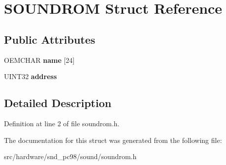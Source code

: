 \hypertarget{structSOUNDROM}{\section{S\-O\-U\-N\-D\-R\-O\-M Struct Reference}
\label{structSOUNDROM}
}
\subsection*{Public Attributes}
\begin{DoxyCompactItemize}
\item 
\hypertarget{structSOUNDROM_ac83eff0bb28762a6cf0d5c9774bd300c}{O\-E\-M\-C\-H\-A\-R {\bfseries name} \mbox{[}24\mbox{]}}\label{structSOUNDROM_ac83eff0bb28762a6cf0d5c9774bd300c}

\item 
\hypertarget{structSOUNDROM_a24847aa6e1d39fa3bcf5136e82a1481f}{U\-I\-N\-T32 {\bfseries address}}\label{structSOUNDROM_a24847aa6e1d39fa3bcf5136e82a1481f}

\end{DoxyCompactItemize}


\subsection{Detailed Description}


Definition at line 2 of file soundrom.\-h.



The documentation for this struct was generated from the following file\-:\begin{DoxyCompactItemize}
\item 
src/hardware/snd\-\_\-pc98/sound/soundrom.\-h\end{DoxyCompactItemize}
